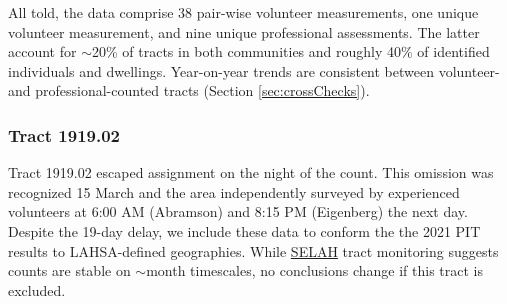\documentclass[11pt,twocolumn]{article}
\def\Count{count}
\begin{document}
All told, the data comprise 38 pair-wise volunteer measurements, one unique volunteer measurement, 
and nine unique professional assessments. The latter account for $\sim$20\% of tracts in both communities 
and roughly 40\% of identified individuals and dwellings. Year-on-year trends are consistent between
volunteer- and professional-counted tracts (Section \ref{sec:crossChecks}). 

\subsubsection{Tract 1919.02}
\label{sec:191902}

Tract 1919.02 escaped assignment on the night of the \Count. This omission was recognized 15 March
and the area independently surveyed by experienced volunteers at 6:00 AM (Abramson) and 
8:15 PM (Eigenberg) the next day. Despite the 19-day delay, we include these data to conform the 
the 2021 PIT results to LAHSA-defined geographies. While \href{https://selahnhc.org}
{SELAH} tract monitoring suggests counts are stable on $\sim$month timescales, no conclusions
change if this tract is excluded.%
\end{document}
